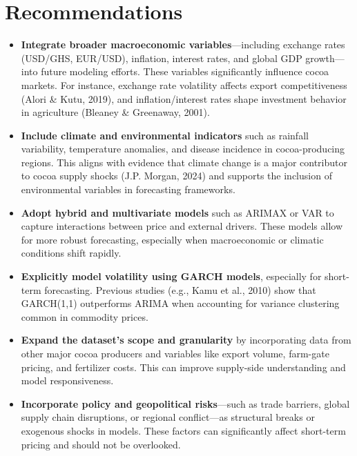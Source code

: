 \section{Recommendations}
\begin{itemize}
  \item \textbf{Integrate broader macroeconomic variables}—including exchange rates (USD/GHS, EUR/USD), inflation, interest rates, and global GDP growth—into future modeling efforts. These variables significantly influence cocoa markets. For instance, exchange rate volatility affects export competitiveness (Alori \& Kutu, 2019), and inflation/interest rates shape investment behavior in agriculture (Bleaney \& Greenaway, 2001).
  
  \item \textbf{Include climate and environmental indicators} such as rainfall variability, temperature anomalies, and disease incidence in cocoa-producing regions. This aligns with evidence that climate change is a major contributor to cocoa supply shocks (J.P. Morgan, 2024) and supports the inclusion of environmental variables in forecasting frameworks.

  \item \textbf{Adopt hybrid and multivariate models} such as ARIMAX or VAR to capture interactions between price and external drivers. These models allow for more robust forecasting, especially when macroeconomic or climatic conditions shift rapidly.

  \item \textbf{Explicitly model volatility using GARCH models}, especially for short-term forecasting. Previous studies (e.g., Kamu et al., 2010) show that GARCH(1,1) outperforms ARIMA when accounting for variance clustering common in commodity prices.

  \item \textbf{Expand the dataset's scope and granularity} by incorporating data from other major cocoa producers and variables like export volume, farm-gate pricing, and fertilizer costs. This can improve supply-side understanding and model responsiveness.

  \item \textbf{Incorporate policy and geopolitical risks}—such as trade barriers, global supply chain disruptions, or regional conflict—as structural breaks or exogenous shocks in models. These factors can significantly affect short-term pricing and should not be overlooked.

\end{itemize}
